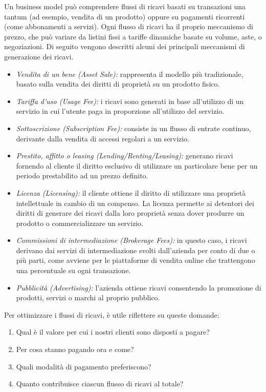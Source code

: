 Un business model può comprendere flussi di ricavi basati su transazioni una tantum (ad esempio, vendita di un prodotto) oppure su pagamenti ricorrenti (come abbonamenti a servizi). Ogni flusso di ricavi ha il proprio meccanismo di prezzo, che può variare da listini fissi a tariffe dinamiche basate su volume, aste, o negoziazioni. Di seguito vengono descritti alcuni dei principali meccanismi di generazione dei ricavi.

\begin{itemize}
    \item \textit{Vendita di un bene (Asset Sale):} rappresenta il modello più tradizionale, basato sulla vendita dei diritti di proprietà su un prodotto fisico.
    \item \textit{Tariffa d’uso (Usage Fee):} i ricavi sono generati in base all’utilizzo di un servizio in cui l’utente paga in proporzione all'utilizzo del servizio.
    \item \textit{Sottoscrizione (Subscription Fee):} consiste in un flusso di entrate continuo, derivante dalla vendita di accessi regolari a un servizio.
    \item \textit{Prestito, affitto o leasing (Lending/Renting/Leasing):} generano ricavi fornendo al cliente il diritto esclusivo di utilizzare un particolare bene per un periodo prestabilito ad un prezzo definito.
    \item \textit{Licenza (Licensing):} il cliente ottiene il diritto di utilizzare una proprietà intellettuale in cambio di un compenso. La licenza permette ai detentori dei diritti di generare dei ricavi dalla loro proprietà senza dover produrre un prodotto o commercializzare un servizio.
    \item \textit{Commissioni di intermediazione (Brokerage Fees):} in questo caso, i ricavi derivano dai servizi di intermediazione svolti dall’azienda per conto di due o più parti, come avviene per le piattaforme di vendita online che trattengono una percentuale su ogni transazione.
    \item \textit{Pubblicità (Advertising):} l’azienda ottiene ricavi consentendo la promozione di prodotti, servizi o marchi al proprio pubblico.
\end{itemize}
Per ottimizzare i flussi di ricavi, è utile riflettere su queste domande:
\begin{enumerate}
    \item Qual è il valore per cui i nostri clienti sono disposti a pagare?
    \item Per cosa stanno pagando ora e come?
    \item Quali modalità di pagamento preferiscono?
    \item Quanto contribuisce ciascun flusso di ricavi al totale?
\end{enumerate}

